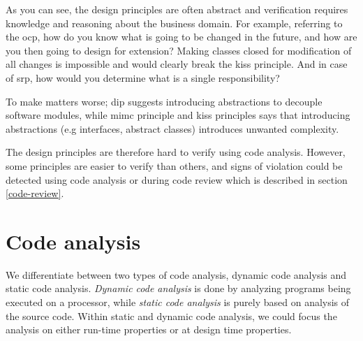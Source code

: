 \documentclass{report}
\begin{document}
As you can see, the design principles are often abstract and verification requires knowledge and reasoning about the business domain. For example, referring to the \gls{ocp}, how do you know what is going to be changed in the future, and how are you then going to design for extension? Making classes closed for modification of all changes is impossible and would clearly break the \gls{kiss} principle. And in case of \gls{srp}, how would you determine what is a single responsibility? 

To make matters worse; \gls{dip} suggests introducing abstractions to decouple software modules, while \gls{mimc} principle and \gls{kiss} principles says that introducing abstractions (e.g interfaces, abstract classes) introduces unwanted complexity.

The design principles are therefore hard to verify using code analysis. However, some principles are easier to verify than others, and signs of violation could be detected using code analysis or during code review which is described in section \ref{code-review}.

\section{Code analysis}
We differentiate between two types of code analysis, dynamic code analysis and static code analysis. \textit{Dynamic code analysis} is done by analyzing programs being executed on a processor, while \textit{static code analysis} is purely based on analysis of the source code. Within static and dynamic code analysis, we could focus the analysis on either run-time properties or at design time properties.
\end{document}
